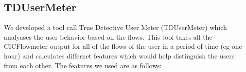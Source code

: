 \subsection{TDUserMeter}
We developed a tool call True Detective User Meter (TDUserMeter) which analyases the user behavior based on the flows. This tool takes all the CICFlowmeter output for all of the flows of the user in a period of time (eg one hour) and calculates differnet features which would help distinguish the users from each other. The features we used are as follows:

